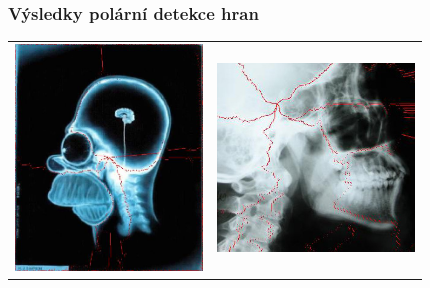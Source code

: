 \documentclass{beamer}
\begin{document}
	
	\begin{frame}[t,fragile]
		\frametitle{Výsledky polární detekce hran}	
\begin{center}


		\begin{tabular}{ll}
			\includegraphics[height=60mm]{homer-polar.jpg} &		
			\includegraphics[height=50mm]{skull.jpg}
		\end{tabular}
		\end{center}
	
		

		
	\end{frame}
	
\end{document}
